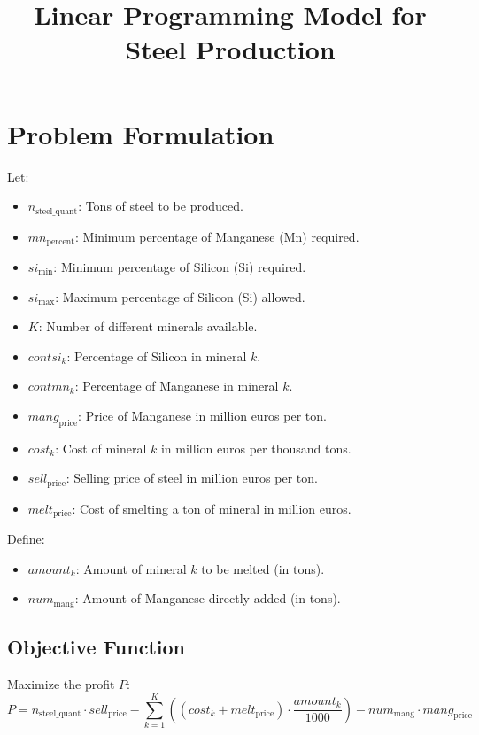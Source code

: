 \documentclass{article}
\begin{document}
\title{Linear Programming Model for Steel Production}
\author{}
\date{}
\maketitle

\section*{Problem Formulation}

Let:
\begin{itemize}
    \item $n_{\text{steel\_quant}}$: Tons of steel to be produced.
    \item $mn_{\text{percent}}$: Minimum percentage of Manganese (Mn) required.
    \item $si_{\text{min}}$: Minimum percentage of Silicon (Si) required.
    \item $si_{\text{max}}$: Maximum percentage of Silicon (Si) allowed.
    \item $K$: Number of different minerals available.
    \item $contsi_k$: Percentage of Silicon in mineral $k$.
    \item $contmn_k$: Percentage of Manganese in mineral $k$.
    \item $mang_{\text{price}}$: Price of Manganese in million euros per ton.
    \item $cost_k$: Cost of mineral $k$ in million euros per thousand tons.
    \item $sell_{\text{price}}$: Selling price of steel in million euros per ton.
    \item $melt_{\text{price}}$: Cost of smelting a ton of mineral in million euros.
\end{itemize}

Define:
\begin{itemize}
    \item $amount_k$: Amount of mineral $k$ to be melted (in tons).
    \item $num_{\text{mang}}$: Amount of Manganese directly added (in tons).
\end{itemize}

\subsection*{Objective Function}

Maximize the profit $P$:
\[
P = n_{\text{steel\_quant}} \cdot sell_{\text{price}} - \sum_{k=1}^{K} \left( \left( cost_k + melt_{\text{price}} \right) \cdot \frac{amount_k}{1000} \right) - num_{\text{mang}} \cdot mang_{\text{price}}
\]
\end{document}
